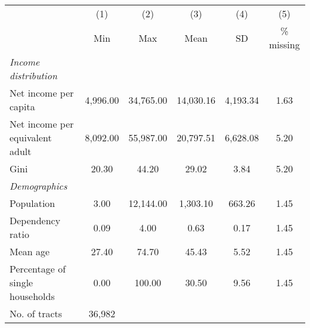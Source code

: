 
\begin{tabular}{@{}lccccc@{}}
\toprule
  & (1) & (2) & (3) &  (4) &  (5) \\
 & Min & Max & Mean & SD & \% missing\\
\midrule
\qquad \textit{Income distribution} \\
Net income per capita &  4,996.00 & 34,765.00 & 14,030.16 &  4,193.34 &      1.63\\
Net income per equivalent adult &  8,092.00 & 55,987.00 & 20,797.51 &  6,628.08 &      5.20\\
Gini &     20.30 &     44.20 &     29.02 &      3.84 &      5.20\\
\qquad \textit{Demographics} \\
Population &      3.00 & 12,144.00 &  1,303.10 &    663.26 &      1.45\\
Dependency ratio &      0.09 &      4.00 &      0.63 &      0.17 &      1.45\\
Mean age &     27.40 &     74.70 &     45.43 &      5.52 &      1.45\\
Percentage of single households &      0.00 &    100.00 &     30.50 &      9.56 &      1.45\\
\midrule
No. of tracts &          36,982 \\
\midrule
\end{tabular}